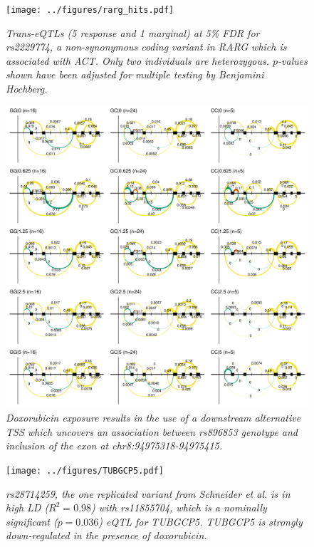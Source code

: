 \documentclass{article}
\begin{document}
\begin{figure}[h]
\begin{center}
    \texttt{[image: ../figures/rarg\_hits.pdf]} 
    \caption{\it{Trans-eQTLs (5 response and 1 marginal) at 5\% FDR for rs2229774, a non-synonymous coding variant in \emph{RARG} which is associated with ACT\cite{Aminkeng2015}. Only two individuals are heterozygous. $p$-values shown have been adjusted for multiple testing by Benjamini Hochberg.}}
    \label{fig:rarg_hits}
    \end{center}
\end{figure}


\begin{figure}[h]
\begin{center}
    \includegraphics[width=1\textwidth]{../figures/NDUFAF6.pdf} %
    \caption{\it{Doxorubicin exposure results in the use of a downstream alternative TSS which uncovers an association between rs896853 genotype and inclusion of the exon at chr8:94975318-94975415.}}
    \label{fig:NDUFAF6}
    \end{center}
\end{figure}

\begin{figure}[h]
\begin{center}
    \texttt{[image: ../figures/TUBGCP5.pdf]} %
    \caption{\it{rs28714259, the one replicated variant from Schneider et al.\cite{Schneider2016} is in high LD ($R^2=0.98$) with rs11855704, which is a nominally significant ($p=0.036$) eQTL for \emph{TUBGCP5}. \emph{TUBGCP5} is strongly down-regulated in the presence of doxorubicin.}}
    \label{fig:TUBGCP5}
    \end{center}
\end{figure}
\end{document}
